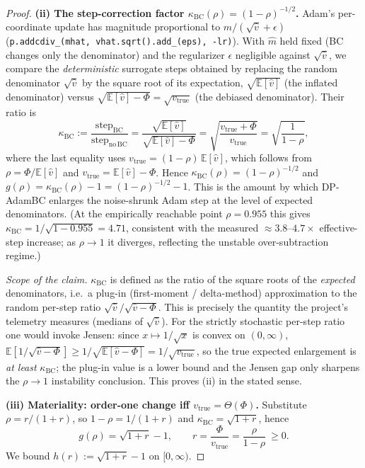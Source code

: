 \begin{proof}
\medskip
\noindent\textbf{(ii) The step-correction factor $\kappa_{\mathrm{BC}}(\rho)=(1-\rho)^{-1/2}$.}
Adam's per-coordinate update has magnitude proportional to $\hat m/(\sqrt{\hat v}+\epsilon)$ (\texttt{p.addcdiv\_(mhat, vhat.sqrt().add\_(eps), -lr)}). With $\hat m$ held fixed (BC changes only the denominator) and the regularizer $\epsilon$ negligible against $\sqrt{\hat v}$, we compare the \emph{deterministic} surrogate steps obtained by replacing the random denominator $\sqrt{\hat v}$ by the square root of its expectation, $\sqrt{\mathbb E[\hat v]}$ (the inflated denominator) versus $\sqrt{\mathbb E[\hat v]-\Phi}=\sqrt{v_{\mathrm{true}}}$ (the debiased denominator). Their ratio is
\[
\kappa_{\mathrm{BC}}
:=\frac{\text{step}_{\mathrm{BC}}}{\text{step}_{\mathrm{no\,BC}}}
=\frac{\sqrt{\mathbb E[\hat v]}}{\sqrt{\mathbb E[\hat v]-\Phi}}
=\sqrt{\frac{v_{\mathrm{true}}+\Phi}{v_{\mathrm{true}}}}
=\sqrt{\frac{1}{1-\rho}},
\]
where the last equality uses $v_{\mathrm{true}}=(1-\rho)\,\mathbb E[\hat v]$, which follows from $\rho=\Phi/\mathbb E[\hat v]$ and $v_{\mathrm{true}}=\mathbb E[\hat v]-\Phi$. Hence $\kappa_{\mathrm{BC}}(\rho)=(1-\rho)^{-1/2}$ and $g(\rho)=\kappa_{\mathrm{BC}}(\rho)-1=(1-\rho)^{-1/2}-1$. This is the amount by which DP-AdamBC enlarges the noise-shrunk Adam step at the level of expected denominators. (At the empirically reachable point $\rho=0.955$ this gives $\kappa_{\mathrm{BC}}=1/\sqrt{1-0.955}=4.71$, consistent with the measured $\approx 3.8$--$4.7\times$ effective-step increase; as $\rho\to 1$ it diverges, reflecting the unstable over-subtraction regime.)

\emph{Scope of the claim.} $\kappa_{\mathrm{BC}}$ is defined as the ratio of the square roots of the \emph{expected} denominators, i.e.\ a plug-in (first-moment / delta-method) approximation to the random per-step ratio $\sqrt{\hat v}/\sqrt{\hat v-\Phi}$. This is precisely the quantity the project's telemetry measures (medians of $\sqrt{\hat v}$). For the strictly stochastic per-step ratio one would invoke Jensen: since $x\mapsto 1/\sqrt{x}$ is convex on $(0,\infty)$, $\mathbb E[1/\sqrt{\hat v-\Phi}]\ge 1/\sqrt{\mathbb E[\hat v-\Phi]}=1/\sqrt{v_{\mathrm{true}}}$, so the true expected enlargement is \emph{at least} $\kappa_{\mathrm{BC}}$; the plug-in value is a lower bound and the Jensen gap only sharpens the $\rho\to1$ instability conclusion. This proves (ii) in the stated sense.

\medskip
\noindent\textbf{(iii) Materiality: order-one change iff $v_{\mathrm{true}}=\Theta(\Phi)$.}
Substitute $\rho=r/(1+r)$, so $1-\rho=1/(1+r)$ and $\kappa_{\mathrm{BC}}=\sqrt{1+r}$, hence
\[
g(\rho)=\sqrt{1+r}-1,\qquad r=\frac{\Phi}{v_{\mathrm{true}}}=\frac{\rho}{1-\rho}\ \ge 0 .
\]
We bound $h(r):=\sqrt{1+r}-1$ on $[0,\infty)$.


\end{proof}
